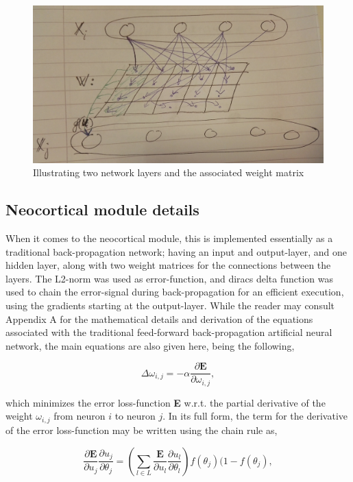 \begin{figure}
    \centering
    \includegraphics[width=12cm]{fig/network_layout}
    \caption{Illustrating two network layers and the associated weight matrix}
    \label{fig:network_layout}
\end{figure}


\subsection{Neocortical module details}

When it comes to the neocortical module, this is implemented essentially as a traditional back-propagation network; having an input and output-layer, and one hidden layer, along with two weight matrices for the connections between the layers. The L2-norm was used as error-function, and diracs delta function was used to chain the error-signal during back-propagation for an efficient execution, using the gradients starting at the output-layer. While the reader may consult Appendix A for the mathematical details and derivation of the equations associated with the traditional feed-forward back-propagation artificial neural network, the main equations are also given here, being the following,

\begin{equation}
    \Delta \omega_{i,j} = -\alpha \frac{\partial \textbf{E}}{\partial \omega_{i,j}},
\end{equation}

\noindent
which minimizes the error loss-function \textbf{E} w.r.t. the partial derivative of the weight $\omega_{i,j}$ from neuron $i$ to neuron $j$.
In its full form, the term for the derivative of the error loss-function may be written using the chain rule as,

\begin{equation}
    \frac{\partial \textbf{E}}{\partial u_j}\frac{\partial u_j}{\partial \theta_j} = 
    (\sum_{l \in L}\frac{\textbf{E}}{\partial u_l}\frac{\partial u_l}{\partial \theta_l}) f(\theta_j)(1-f(\theta_j),
\end{equation}

